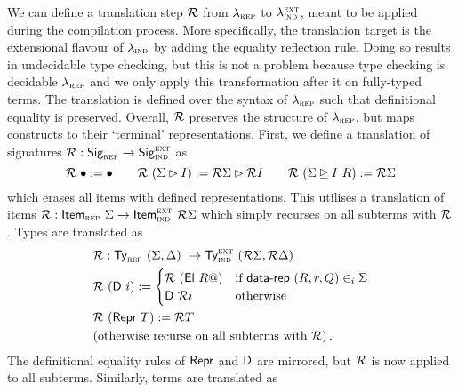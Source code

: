 We can define a translation step $\mathcal{R}$ from $\lambda_{\textsc{rep}}$ to
$\lambda_{\textsc{ind}}^{\textsc{ext}}$, meant to be applied during the compilation process.
More specifically, the translation target is the extensional flavour of
$\lambda_{\textsc{ind}}$ by adding the equality reflection rule. Doing so results in undecidable
type checking, but this is not a problem because type checking is decidable
$\lambda_{\textsc{rep}}$ and we only apply this transformation after it on fully-typed terms.
The translation is defined over the syntax of $\lambda_{\textsc{rep}}$
\cite{Boulier2017-cm} such that definitional equality is preserved. Overall,
$\mathcal{R}$ preserves the structure of $\lambda_{\textsc{rep}}$, but maps constructs to
their `terminal' representations.
First, we define a translation of signatures $\mathcal{R} : \textsf{Sig}_{\textsc{rep}} \to \textsf{Sig}_{\textsc{ind}}^\textsc{ext}$ as
\[
\R\ \bullet := \bullet \qquad \R\ (\Sigma \rhd I) := \R \Sigma \rhd \R I \qquad \R\ (\Sigma \unrhd I \ R) := \R \Sigma
\]
which erases all items with defined representations.
This utilises a translation of items $\R : \Item_\rep\ \Sigma \to \Item_\ind^\lang{ext}\ \R
\Sigma$ which simply recurses on all subterms with $\mathcal{R}$.
Types are translated as
\begin{align*}
  & \mathcal{R} : \textsf{Ty}_{\textsc{rep}}\ (\Sigma, \Delta)\ \to \textsf{Ty}_{\textsc{ind}}^\textsc{ext}\ (\mathcal{R} \Sigma, \mathcal{R} \Delta) \\
  & \mathcal{R}\ (\textsf{D}\ i) := \begin{cases}
  \mathcal{R}\ (\textsf{El}\ R@) & \text{if $\textsf{data-rep}\ (R, r, Q) \in_i \Sigma$} \\
  \textsf{D}\ \mathcal{R} i & \text{otherwise}
  \end{cases} \\
  & \mathcal{R}\ (\textsf{Repr}\ T) := \mathcal{R} T \\
  & \text{(otherwise recurse on all subterms with $\mathcal{R}$)} \,.
\end{align*}
The definitional equality rules of $\textsf{Repr}$ and $\textsf{D}$ are mirrored, but $\mathcal{R}$ is now applied
to all subterms.
Similarly, terms are translated as
